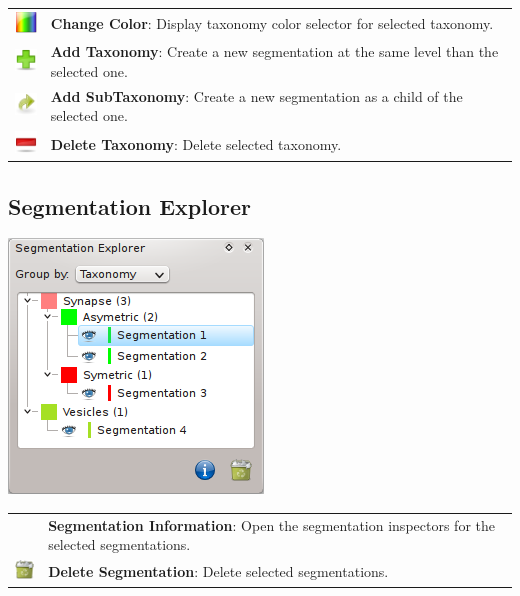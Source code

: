 \begin{tabular}{m{0.8cm} m{13cm}}
\includegraphics[width=0.7cm]{../../frontend/rsc/rainbow} &
\textbf{Change Color}: Display taxonomy color selector for selected taxonomy.\\
\includegraphics[width=0.7cm]{../../frontend/rsc/add} &
\textbf{Add Taxonomy}: Create a new segmentation at the same level than the
selected one.\\
\includegraphics[width=0.7cm]{../../frontend/rsc/add_child} &
\textbf{Add SubTaxonomy}: Create a new segmentation as a child of the selected
one.\\
\includegraphics[width=0.7cm]{../../frontend/rsc/remove} &
\textbf{Delete Taxonomy}: Delete selected taxonomy.
\end{tabular}
\vspace{0.3cm}

\subsection{Segmentation Explorer}

\begin{center}
\includegraphics{fig/SegmentationExplorer}
\end{center}

\begin{tabular}{m{0.8cm} m{13cm}}
 & %
\textbf{Segmentation Information}: Open the segmentation inspectors for the
selected segmentations.\\
\includegraphics[width=0.7cm]{../../frontend/rsc/trash-full} &
\textbf{Delete Segmentation}: Delete selected segmentations.
\end{tabular}
\vspace{0.3cm}

